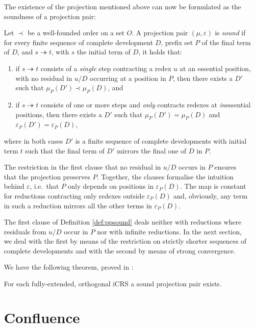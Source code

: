 \documentclass{LMCS}
\theoremstyle{plain}
\theoremstyle{definition}
\newcommand{\trewt}{\twoheadrightarrow}
\newcommand{\pmap}{\varepsilon}
\newcommand{\pmapp}[2]{\pmap_{#1}({#2})}
\newcommand{\pme}{\mu}
\newcommand{\pmep}[2]{\pme_{#1}({#2})}
\begin{document}
The existence of the projection mentioned above can now be formulated as the soundness of a projection pair:
\begin{defi}
\label{def:ppsound}
Let $\prec$ be a well-founded order on a set $O$. A projection pair $(\pme, \pmap)$ is \emph{sound} if for every finite sequence of complete development $D$, prefix set $P$ of the final term of $D$, and $s \trewt t$, with $s$ the initial term of $D$, it holds that:
\begin{enumerate}[(1)]
\item
if $s \trewt t$ consists of a \emph{single} step contracting a redex $u$ at an essential position, with no residual in $u/D$ occurring at a position in $P$, then there exists a $D'$ such that $\pmep{P}{D'} \prec \pmep{P}{D}$, and
\item
if $s \trewt t$ consists of one or more steps and \emph{only} contracts redexes at \emph{in}essential positions, then there exists a $D'$ such that $\pmep{P}{D'} = \pmep{P}{D}$ and $\pmapp{P}{D'} = \pmapp{P}{D}$,
\end{enumerate}
where in both cases $D'$ is a finite sequence of complete developments with initial term $t$ such that the final term of $D'$ mirrors the final one of $D$ in $P$.
\end{defi}
\noindent The restriction in the first clause that no residual in $u/D$ occurs in $P$ ensures that the projection preserves $P$. Together, the clauses formalise the intuition behind $\pmap$, i.e.\ that $P$ only depends on positions in $\pmapp{P}{D}$. The map is constant for reductions contracting only redexes outside $\pmapp{P}{D}$ and, obviously, any term in such a reduction mirrors all the other terms in $\pmapp{P}{D}$.

\begin{rem}
The first clause of Definition \ref{def:ppsound} deals neither with reductions where residuals from $u/D$ occur in $P$ nor with infinite reductions. In the next section, we deal with the first by means of the restriction on strictly shorter sequences of complete developments and with the second by means of strong convergence.
\end{rem}

We have the following theorem, proved in \cite{paper_iii}:

\begin{thm}
\label{thm:pp}
For each fully-extended, orthogonal iCRS a sound projection pair exists.
\end{thm}

\section{Confluence}
\label{sec:confluence}
\end{document}
